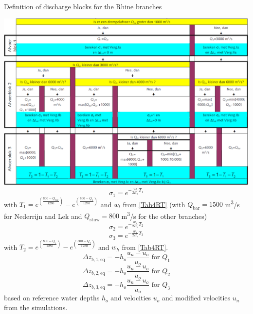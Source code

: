 \begin{table}
\caption{Definition of discharge blocks for the Rhine branches}
\label{Tab7}
\includegraphics[width=\columnwidth]{figures/Tab7.png}
%
\begin{equation}
\sigma_1 = e^{-\frac{w_l}{2 B_n} T_1}
\end{equation}
with $T_1 = e^{\left ( \frac{800-Q_\text{bar}}{1280} \right )} - e^{\left ( \frac{800-Q_1}{1280} \right )}$ and $w_l$ from \autoref{Tab4RT} (with $Q_\text{bar} = 1500$ m\textsuperscript{3}/s for Nederrijn and Lek and $Q_\text{stuw} = 800$ m\textsuperscript{3}/s for the other branches)
%
\begin{equation}
\sigma_2 = e^{-\frac{w_h}{2 B_n} T_2}
\end{equation}
%
\begin{equation}
\sigma_3 = e^{-\frac{w_h}{2 B_n} T_3}
\end{equation}
with $T_2 = e^{\left ( \frac{800-Q_1}{1280} \right )} - e^{\left ( \frac{800-Q_2}{1280} \right )}$ and $w_h$ from \autoref{Tab4RT}.
%
\begin{equation}
\Delta z_{b,1,\text{eq}} = -h_o \frac{u_n - u_o}{u_o} \text{  for $Q_1$}
\end{equation}
%
\begin{equation}
\Delta z_{b,2,\text{eq}} = -h_o \frac{u_n - u_o}{u_o} \text{  for $Q_2$}
\end{equation}
%
\begin{equation}
\Delta z_{b,3,\text{eq}} = -h_o \frac{u_n - u_o}{u_o} \text{  for $Q_3$}
\end{equation}
based on reference water depths $h_o$ and velocities $u_o$ and modified velocities $u_n$ from the simulations.
\end{table}


